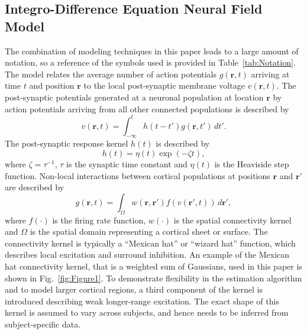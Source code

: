 \documentclass[review,authoryear,3p]{elsarticle}
\begin{document}
\subsection{Integro-Difference Equation Neural Field Model}\label{IntegroDifferenceEquationSection} 
The combination of modeling techniques in this paper leads to a large amount of notation, so a reference of the symbols used is provided in Table~\ref{tab:Notation}. The model relates the average number of action potentials $g(\mathbf{r},t)$ arriving at time $t$ and position $\mathbf{r}$ to the local post-synaptic membrane voltage $v(\mathbf{r},t)$. The post-synaptic potentials generated at a neuronal population at location $\mathbf{r}$ by action potentials arriving from all other connected populations is described by 
\begin{equation}
	\label{SpikesToPotential} v\left( {\mathbf{r},t} \right) = \int_{ - \infty }^t {h\left( {t - t'} \right)g\left( {\mathbf{r},t'} \right) \, dt'}. 
\end{equation}
The post-synaptic response kernel $h(t)$ is described by 
\begin{equation}
	\label{SynapticRespKernel} h(t) = \eta(t)\exp{\left(-\zeta t\right)}, 
\end{equation}
where $\zeta=\tau^{-1}$, $\tau$ is the synaptic time constant and $\eta(t)$ is the Heaviside step function. Non-local interactions between cortical populations at positions $\mathbf{r}$ and $\mathbf{r}'$ are described by 
\begin{equation}
	\label{RateBasedInteractions} g\left( \mathbf{r},t \right) = \int_\Omega {w\left( \mathbf{r},\mathbf{r}' \right)f\left( v\left( \mathbf{r}',t \right) \right)\, d\mathbf{r}'}, 
\end{equation}
where $f(\cdot)$ is the firing rate function, $w(\cdot)$ is the spatial connectivity kernel and $\Omega$ is the spatial domain representing a cortical sheet or surface. The connectivity kernel is typically a ``Mexican hat'' or ``wizard hat'' function, which describes local excitation and surround inhibition. An example of the Mexican hat connectivity kernel, that is a weighted sum of Gaussians, used in this paper is shown in Fig.~\ref{fig:Figure1}. To demonstrate flexibility in the estimation algorithm and to model larger cortical regions, a third component of the kernel is introduced describing weak longer-range excitation. The exact shape of this kernel is assumed to vary across subjects, and hence needs to be inferred from subject-specific data.
\end{document}

